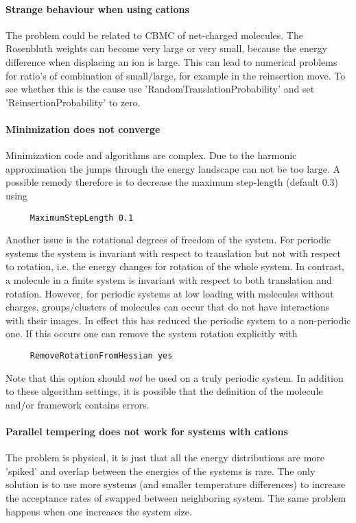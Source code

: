 \paragraph*{Strange behaviour when using cations}
The problem could be related to CBMC of net-charged molecules. The Rosenbluth weights can become very large
or very small, because the energy difference when displacing an ion is large. This can lead to numerical
problems for ratio's of combination of small/large, for example in the reinsertion move.
To see whether this is the cause
use 'RandomTranslationProbability' and set 'ReinsertionProbability' to zero.

\paragraph*{Minimization does not converge}
Minimization code and algorithms are complex. Due to the harmonic approximation the jumps through
the energy landscape can not be too large. A possible remedy therefore is to decrease the maximum 
step-length (default 0.3) using
\begin{verbatim}
     MaximumStepLength 0.1
\end{verbatim}
Another issue is the rotational degrees of freedom of the system. For periodic systems the system
is invariant with respect to translation but not with respect to rotation, 
i.e. the energy changes for rotation of the whole system.
In contrast, a molecule in a finite system is invariant with respect to both translation and rotation.
However, for periodic systems at low loading with molecules without charges, groups/clusters of molecules
can occur that do not have interactions with their images. In effect this has reduced the periodic
system to a non-periodic one. If this occurs one can remove the system rotation explicitly with
\begin{verbatim}
     RemoveRotationFromHessian yes
\end{verbatim}
Note that this option should \emph{not} be used on a truly periodic system.
In addition to these algorithm settings, it is possible that the definition of the molecule 
and/or framework contains errors.

\paragraph*{Parallel tempering does not work for systems with cations} The problem is physical, it is just
that all the energy distributions are more 'spiked' and overlap between the energies of the systems is rare.
The only solution is to use more systems (and smaller temperature differences) to increase the acceptance rates
of swapped between neighboring system.
The same problem happens when one increases the system size.

